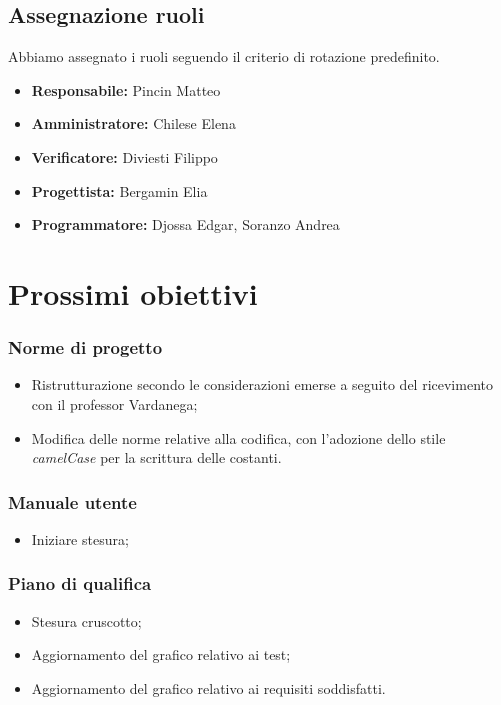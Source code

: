 \subsection{Assegnazione ruoli}
Abbiamo assegnato i ruoli seguendo il criterio di rotazione predefinito.
\begin{itemize}
    \item \textbf{Responsabile:} Pincin Matteo
    \item \textbf{Amministratore:} Chilese Elena
    \item \textbf{Verificatore:} Diviesti Filippo
    \item \textbf{Progettista:} Bergamin Elia
    \item \textbf{Programmatore:} Djossa Edgar, Soranzo Andrea
\end{itemize}
\newpage

\section{Prossimi obiettivi}

\subsubsection{Norme di progetto}
\begin{itemize}
    \item Ristrutturazione secondo le considerazioni emerse a seguito del ricevimento con il professor Vardanega;
    \item Modifica delle norme relative alla codifica, con l’adozione dello stile \textit{camelCase} per la scrittura delle costanti.
\end{itemize}

\subsubsection{Manuale utente}
\begin{itemize}
    \item Iniziare stesura;
\end{itemize}

\subsubsection{Piano di qualifica}
\begin{itemize}
    \item Stesura cruscotto;
    \item Aggiornamento del grafico relativo ai test;
    \item Aggiornamento del grafico relativo ai requisiti soddisfatti.
\end{itemize}


